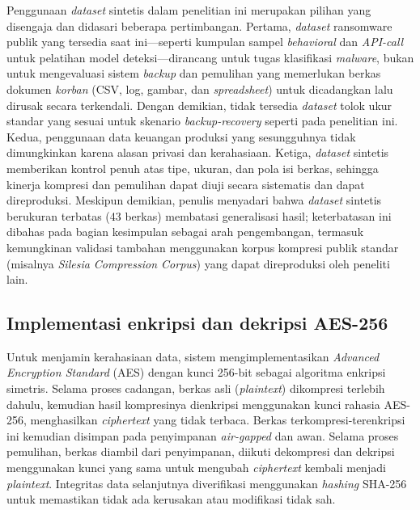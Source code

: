 \documentclass{iaesarticle}
\begin{document}
Penggunaan \textit{dataset} sintetis dalam penelitian ini merupakan pilihan yang disengaja dan didasari beberapa pertimbangan. Pertama, \textit{dataset} ransomware publik yang tersedia saat ini---seperti kumpulan sampel \textit{behavioral} dan \textit{API-call} untuk pelatihan model deteksi---dirancang untuk tugas klasifikasi \textit{malware}, bukan untuk mengevaluasi sistem \textit{backup} dan pemulihan yang memerlukan berkas dokumen \textit{korban} (CSV, log, gambar, dan \textit{spreadsheet}) untuk dicadangkan lalu dirusak secara terkendali. Dengan demikian, tidak tersedia \textit{dataset} tolok ukur standar yang sesuai untuk skenario \textit{backup-recovery} seperti pada penelitian ini. Kedua, penggunaan data keuangan produksi yang sesungguhnya tidak dimungkinkan karena alasan privasi dan kerahasiaan. Ketiga, \textit{dataset} sintetis memberikan kontrol penuh atas tipe, ukuran, dan pola isi berkas, sehingga kinerja kompresi dan pemulihan dapat diuji secara sistematis dan dapat direproduksi. Meskipun demikian, penulis menyadari bahwa \textit{dataset} sintetis berukuran terbatas (43 berkas) membatasi generalisasi hasil; keterbatasan ini dibahas pada bagian kesimpulan sebagai arah pengembangan, termasuk kemungkinan validasi tambahan menggunakan korpus kompresi publik standar (misalnya \textit{Silesia Compression Corpus}) yang dapat direproduksi oleh peneliti lain.

\subsection{Implementasi enkripsi dan dekripsi AES-256}
Untuk menjamin kerahasiaan data, sistem mengimplementasikan \textit{Advanced Encryption Standard} (AES) dengan kunci 256-bit sebagai algoritma enkripsi simetris. Selama proses cadangan, berkas asli (\textit{plaintext}) dikompresi terlebih dahulu, kemudian hasil kompresinya dienkripsi menggunakan kunci rahasia AES-256, menghasilkan \textit{ciphertext} yang tidak terbaca. Berkas terkompresi-terenkripsi ini kemudian disimpan pada penyimpanan \textit{air-gapped} dan awan. Selama proses pemulihan, berkas diambil dari penyimpanan, diikuti dekompresi dan dekripsi menggunakan kunci yang sama untuk mengubah \textit{ciphertext} kembali menjadi \textit{plaintext}. Integritas data selanjutnya diverifikasi menggunakan \textit{hashing} SHA-256 untuk memastikan tidak ada kerusakan atau modifikasi tidak sah.
\end{document}
